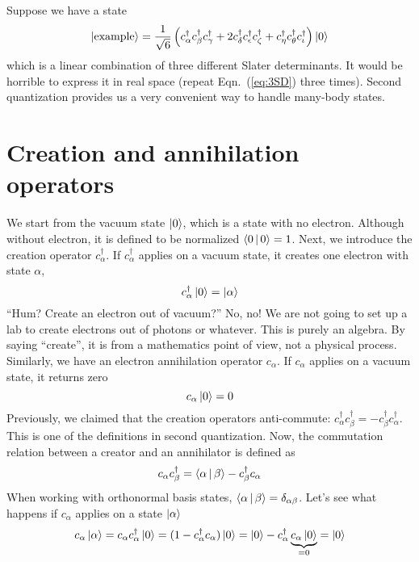 Suppose we have a state
\begin{equation}
\Ket{\text{example}} = \frac{1}{\sqrt{6}} \left( c_\alpha^\dagger c_\beta^\dagger c_\gamma^\dagger +2c_\delta^\dagger c_\epsilon^\dagger c_\zeta^\dagger +c_\eta^\dagger c_\theta^\dagger c_\iota^\dagger \right)|0\rangle
\end{equation}
%
which is a linear combination of three different Slater determinants.
It would be horrible to express it in real space (repeat Eqn.~(\ref{eq:3SD})
three times). Second quantization provides us a very convenient way
to handle many-body states.

\section{Creation and annihilation operators}
We start from the vacuum state $\Ket{0}$, which is a state with no electron.
Although without electron, it is defined to be normalized $\Braket{0|0}=1$.
Next, we introduce the creation operator $c_\alpha^\dagger$.
If $c_\alpha^\dagger$ applies on a vacuum state,
it creates one electron with state $\alpha$,
\begin{equation}
c_\alpha^\dagger \Ket{0} = \Ket{\alpha}
\end{equation}
%
``Hum? Create an electron out of vacuum?'' No, no! We are not going to
set up a lab to create electrons out of photons or whatever. This is purely
an algebra. By saying ``create'', it is from a mathematics point of view,
not a physical process. Similarly, we have an electron annihilation operator
$c_\alpha$. If $c_\alpha$ applies on a vacuum state, it returns zero
\begin{equation}
c_\alpha \Ket{0} = 0
\end{equation}
%
Previously, we claimed that the creation operators anti-commute:
$c_\alpha^\dagger c_\beta^\dagger = -c_\beta^\dagger c_\alpha^\dagger$.
This is one of the definitions in second quantization. Now, the commutation
relation between a creator and an annihilator is defined as
\begin{equation}
c_\alpha c_\beta^\dagger = \Braket{\alpha|\beta} -c_\beta^\dagger c_\alpha
\end{equation}
%
When working with orthonormal basis states, $\Braket{\alpha|\beta}=\delta_{\alpha\beta}$.
Let's see what happens if $c_\alpha$ applies on a state $\Ket{\alpha}$
\begin{equation}
c_\alpha \Ket{\alpha} = c_\alpha c_\alpha^\dagger \Ket{0}
= (1 - c_\alpha^\dagger c_\alpha) \Ket{0}
= \Ket{0} - c_\alpha^\dagger \underbrace{c_\alpha \Ket{0}}_{=0} = \Ket{0}
\end{equation}
